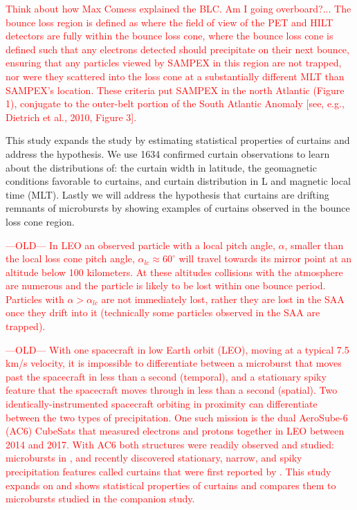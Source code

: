 \documentclass[draft]{agujournal2019}
\begin{document}
\textcolor{red}{Think about how Max Comess explained the BLC. Am I going overboard?... The bounce loss region is defined as
where the field of view of the PET and HILT detectors are
fully within the bounce loss cone, where the bounce loss cone
is defined such that any electrons detected should precipitate
on their next bounce, ensuring that any particles viewed by
SAMPEX in this region are not trapped, nor were they
scattered into the loss cone at a substantially different MLT
than SAMPEX’s location. These criteria put SAMPEX in
the north Atlantic (Figure 1), conjugate to the outer-belt
portion of the South Atlantic Anomaly [see, e.g., Dietrich
et al., 2010, Figure 3].}

This study expands the  study by estimating statistical properties of curtains and address the  hypothesis. We use 1634 confirmed curtain observations to learn about the distributions of: the curtain width in latitude, the geomagnetic conditions favorable to curtains, and curtain distribution in L and magnetic local time (MLT). Lastly we will address the hypothesis that curtains are drifting remnants of microbursts by showing examples of curtains observed in the bounce loss cone region.

\iffalse
\textcolor{red}{---OLD--- In LEO an observed particle with a local pitch angle, $\alpha$, smaller than the local loss cone pitch angle, $\alpha_{lc} \approx 60^\circ$ will travel towards its mirror point at an altitude below 100 kilometers. At these altitudes collisions with the atmosphere are numerous and the particle is likely to be lost within one bounce period. Particles with $\alpha > \alpha_{lc}$ are not immediately lost, rather they are lost in the SAA once they drift into it (technically some particles observed in the SAA are trapped).}

\textcolor{red}{---OLD--- With one spacecraft in low Earth orbit (LEO), moving at a typical 7.5 km/s velocity, it is impossible to differentiate between a microburst that moves past the spacecraft in less than a second (temporal), and a stationary spiky feature that the spacecraft moves through in less than a second (spatial). Two identically-instrumented spacecraft orbiting in proximity can differentiate between the two types of precipitation. One such mission is the dual AeroSube-6 (AC6) CubeSats that measured electrons and protons together in LEO between 2014 and 2017. With AC6 both structures were readily observed and studied: microbursts in , and recently discovered stationary, narrow, and spiky precipitation features called curtains that were first reported by . This study expands on  and shows statistical properties of curtains and compares them to microbursts studied in the  companion study.}
\end{document}
